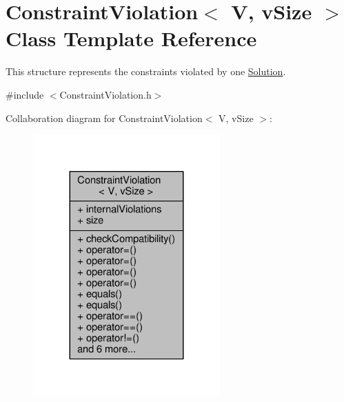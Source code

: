 \hypertarget{structConstraintViolation}{}\section{Constraint\+Violation$<$ V, v\+Size $>$ Class Template Reference}
\label{structConstraintViolation}


This structure represents the constraints violated by one \hyperlink{classSolution}{Solution}.  




{\ttfamily \#include $<$Constraint\+Violation.\+h$>$}



Collaboration diagram for Constraint\+Violation$<$ V, v\+Size $>$\+:
\nopagebreak
\begin{figure}[H]
\begin{center}
\leavevmode
\includegraphics[width=203pt]{structConstraintViolation__coll__graph}
\end{center}
\end{figure}
